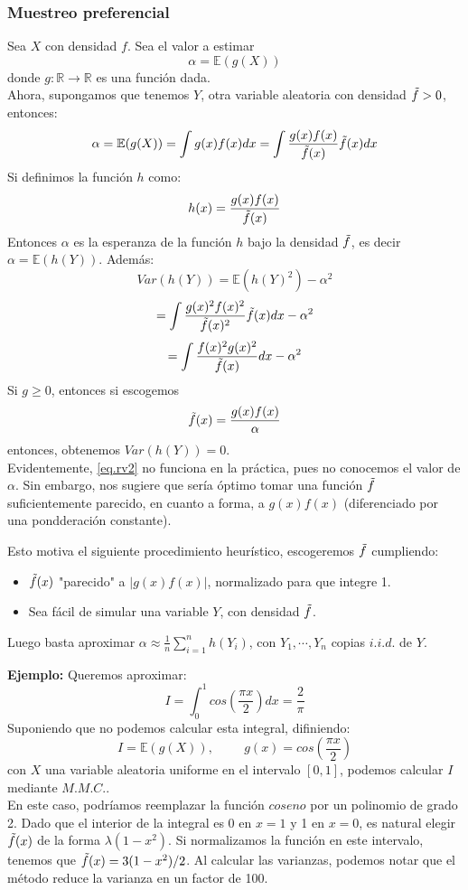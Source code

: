 \documentclass[a4paper]{article}
\numberwithin{equation}{subsection}
\def\R{\mathbb R}
\def\E{\mathbb E}
\begin{document}
\subsubsection{Muestreo preferencial}
Sea $X$ con densidad $f$. Sea el valor a estimar
\[\alpha = \E(g(X))\]
donde $g:\R\rightarrow\R$ es una función dada.\\ \newline
Ahora, supongamos que tenemos $Y$, otra variable aleatoria con densidad $\Tilde{f}>0$, entonces:
\[\alpha = \E(g(X)) = \int g(x)f(x) dx = \int \frac{g(x)f(x)}{\Tilde{f}(x)}\Tilde{f}(x) dx \]
Si definimos la función $h$ como:
\[h(x) = \frac{g(x)f(x)}{\Tilde{f}(x)}\]
Entonces $\alpha$ es la esperanza de la función $h$ bajo la densidad $\Tilde{f}$, es decir $\alpha = \E(h(Y))$. Además:
\[Var(h(Y)) = \E\left(h(Y)^2\right) - \alpha^2\]
\[= \int \frac{g(x)^2f(x)^2}{\Tilde{f}(x)^2}\Tilde{f}(x)dx - \alpha^2\]
\[= \int \frac{f(x)^2g(x)^2}{\Tilde{f}(x)}dx - \alpha^2\]
Si $g\geq 0$, entonces si escogemos \begin{equation}
    \Tilde{f}(x) = \frac{g(x)f(x)}{\alpha}
    \label{eq.rv2}
\end{equation}
entonces, obtenemos $Var(h(Y)) = 0$.\\ Evidentemente, \ref{eq.rv2} no funciona en la práctica, pues no conocemos el valor de $\alpha$. Sin embargo, nos sugiere que sería óptimo tomar una función $\Tilde{f}$ suficientemente parecido, en cuanto a forma, a $g(x)f(x)$ (diferenciado por una pondderación constante).\\ \newline

Esto motiva el siguiente procedimiento heurístico, escogeremos $\Tilde{f}$ cumpliendo:
\begin{itemize}
    \item $\Tilde{f}(x)$ "parecido" a $|g(x)f(x)|$, normalizado para que integre 1.
    \item Sea fácil de simular una variable $Y$, con densidad $\Tilde{f}$.
\end{itemize}
Luego basta aproximar $\alpha \approx \frac{1}{n}\sum_{i=1}^n h(Y_i)$, con $Y_1,\cdots,Y_n$ copias $i.i.d.$ de $Y$.\\ \newline

\textbf{Ejemplo: }Queremos aproximar:
\[I = \int_{0}^1 cos\left(\frac{\pi x}{2}\right)dx = \frac{2}{\pi}\]
Suponiendo que no podemos calcular esta integral, difiniendo:
\[I = \E(g(X)),\hspace{1cm}g(x) = cos\left(\frac{\pi x}{2}\right)\]
con $X$ una variable aleatoria uniforme en el intervalo $[0,1]$, podemos calcular $I$ mediante $M.M.C.$.\\ \newline
En este caso, podríamos reemplazar la función $coseno$ por un polinomio de grado 2. Dado que el interior de la integral es 0 en $x=1$ y 1 en $x=0$, es natural elegir $\Tilde{f}(x)$ de la forma $\lambda(1-x^2)$. Si normalizamos la función en este intervalo, tenemos que $\Tilde{f}(x) = 3(1-x^2)/2$. Al calcular las varianzas, podemos notar que el método reduce la varianza en un factor de 100. \\
\end{document}
